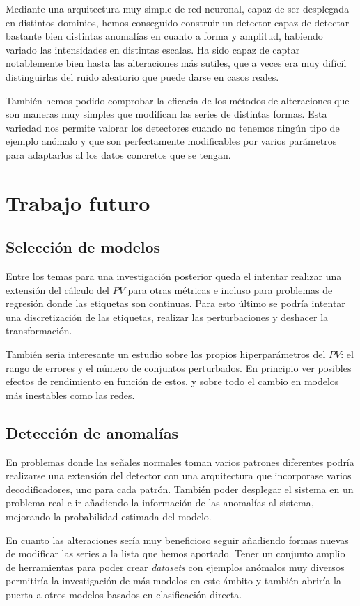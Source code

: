 Mediante una arquitectura muy simple de red neuronal, capaz de ser desplegada en distintos dominios, hemos conseguido construir un detector capaz de detectar bastante bien distintas anomalías en cuanto a forma y amplitud, habiendo variado las intensidades en distintas escalas. Ha sido capaz de captar notablemente bien hasta las alteraciones más sutiles, que a veces era muy difícil distinguirlas del ruido aleatorio que puede darse en casos reales.

También hemos podido comprobar la eficacia de los métodos de alteraciones que son maneras muy simples que modifican las series de distintas formas. Esta variedad nos permite valorar los detectores cuando no tenemos ningún tipo de ejemplo anómalo y que son perfectamente modificables por varios parámetros para adaptarlos al los datos concretos que se tengan.

\section{Trabajo futuro}

\subsection{Selección de modelos}

Entre los temas para una investigación posterior queda el intentar realizar una extensión del cálculo del $PV$ para otras métricas e incluso para problemas de regresión donde las etiquetas son continuas. Para esto último se podría intentar una discretización de las etiquetas, realizar las perturbaciones y deshacer la transformación.

También seria interesante un estudio sobre los propios hiperparámetros del $PV$: el rango de errores y el número de conjuntos perturbados. En principio ver posibles efectos de rendimiento en función de estos, y sobre todo el cambio en modelos más inestables como las redes.

\subsection{Detección de anomalías}

En problemas donde las señales normales toman varios patrones diferentes podría realizarse una extensión del detector con una arquitectura que incorporase varios decodificadores, uno para cada patrón. También poder desplegar el sistema en un problema real e ir añadiendo la información de las anomalías al sistema, mejorando la probabilidad estimada del modelo.

En cuanto las alteraciones sería muy beneficioso seguir añadiendo formas nuevas de modificar las series a la lista que hemos aportado. Tener un conjunto amplio de herramientas para poder crear \emph{datasets} con ejemplos anómalos muy diversos permitiría la investigación de más modelos en este ámbito y también abriría la puerta a otros modelos basados en clasificación directa.

\endinput
